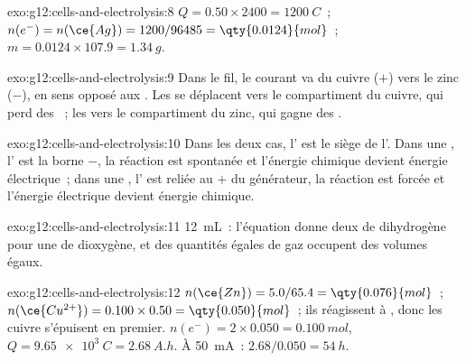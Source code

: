 \begin{solution}{exo:g12:cells-and-electrolysis:8}
$Q = 0.50 \times 2400 = \qty{1200}{C}$~; $n(e^-) = n(\ce{Ag}) =
1200/96485 = \qty{0.0124}{mol}$~; $m = 0.0124 \times 107.9 =
\qty{1.34}{g}$.
\end{solution}

\begin{solution}{exo:g12:cells-and-electrolysis:9}
Dans le fil, le courant va du cuivre ($+$) vers le zinc ($-$), en sens
opposé aux . Les   se déplacent vers le compartiment
du cuivre, qui perd des  ~; les   vers le
compartiment du zinc, qui gagne des  .
\end{solution}

\begin{solution}{exo:g12:cells-and-electrolysis:10}
Dans les deux cas, l' est le siège de l'. Dans une ,
l' est la borne $-$, la réaction est spontanée et l'énergie
chimique devient énergie électrique~; dans une , l' est
reliée au $+$ du
générateur, la réaction est forcée et l'énergie électrique devient
énergie chimique.
\end{solution}

\begin{solution}{exo:g12:cells-and-electrolysis:11}
\qty{12}{mL}~: l'équation  donne deux  de
dihydrogène pour une de dioxygène, et des quantités égales de gaz
occupent des volumes égaux.
\end{solution}

\begin{solution}{exo:g12:cells-and-electrolysis:12}
$n(\ce{Zn}) = 5.0/65.4 = \qty{0.076}{mol}$~;
$n(\ce{Cu^{2+}}) = 0.100 \times 0.50 = \qty{0.050}{mol}$~; ils
réagissent  à , donc les  cuivre s'épuisent en premier.
$n(e^-) = 2 \times 0.050
= \qty{0.100}{mol}$, $Q = \qty{9.65e3}{C} = \qty{2.68}{A.h}$. À
\qty{50}{mA}~: $2.68/0.050 = \qty{54}{h}$.
\end{solution}


